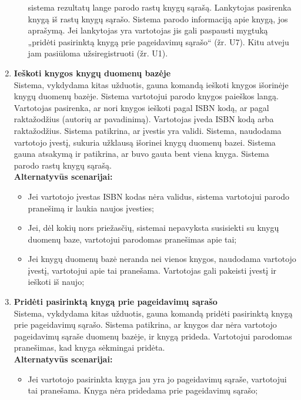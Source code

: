 \documentclass{VUMIFPSkursinis}
\begin{document}
\begin{enumerate}[label=\textbf{U\arabic*.}]
\begin{itemize}
						sistema rezultatų lange parodo rastų knygų sąrašą. Lankytojas pasirenka knygą iš rastų knygų sąrašo.
						Sistema parodo informaciją apie knygą, jos aprašymą. Jei lankytojas yra vartotojas jis gali paspausti mygtuką „pridėti pasirinktą knygą prie pageidavimų sąrašo“ (žr. U7).
						Kitu atveju jam pasiūloma užsiregistruoti (žr. U1).
				\end{itemize}
			\item \textbf{Ieškoti knygos knygų duomenų bazėje}\\
				Sistema, vykdydama kitas užduotis, gauna komandą ieškoti knygos išorinėje knygų duomenų bazėje. 
				Sistema vartotojui parodo knygos paieškos langą. Vartotojas pasirenka, ar nori knygos ieškoti pagal
				ISBN kodą, ar pagal raktažodžius (autorių ar pavadinimą). Vartotojas įveda ISBN kodą arba raktažodžius.
				Sistema patikrina, ar įvestis yra validi. Sistema, naudodama vartotojo įvestį, sukuria užklausą išorinei knygų duomenų bazei. 
				Sistema gauna atsakymą ir patikrina, ar buvo gauta bent viena knyga. Sistema parodo rastų knygų sąrašą.\\
				\textbf{Alternatyvūs scenarijai:}
				\begin{itemize}
					\item Jei vartotojo įvestas ISBN kodas nėra validus, sistema vartotojui parodo pranešimą ir laukia naujos įvesties;
					\item Jei, dėl kokių nors priežasčių, sistemai nepavyksta susisiekti su knygų duomenų baze, vartotojui parodomas pranešimas apie tai;
					\item Jei knygų duomenų bazė neranda nei vienos knygos, naudodama vartotojo įvestį, vartotojui apie tai pranešama. 
						Vartotojas gali pakeisti įvestį ir ieškoti iš naujo;
				\end{itemize}
			\item \textbf{Pridėti pasirinktą knygą prie pageidavimų sąrašo}\\
				Sistema, vykdydama kitas užduotis, gauna komandą pridėti pasirinktą knygą prie pageidavimų sąrašo.
				Sistema patikrina, ar knygos dar nėra vartotojo pageidavimų sąraše duomenų bazėje, ir knygą prideda.
				Vartotojui parodomas pranešimas, kad knyga sėkmingai pridėta.\\
				\textbf{Alternatyvūs scenarijai:}
				\begin{itemize}
					\item Jei vartotojo pasirinkta knyga jau yra jo pageidavimų sąraše, vartotojui tai pranešama. Knyga nėra pridedama prie pageidavimų sąrašo;
				\end{itemize}

\end{enumerate}
\end{document}
